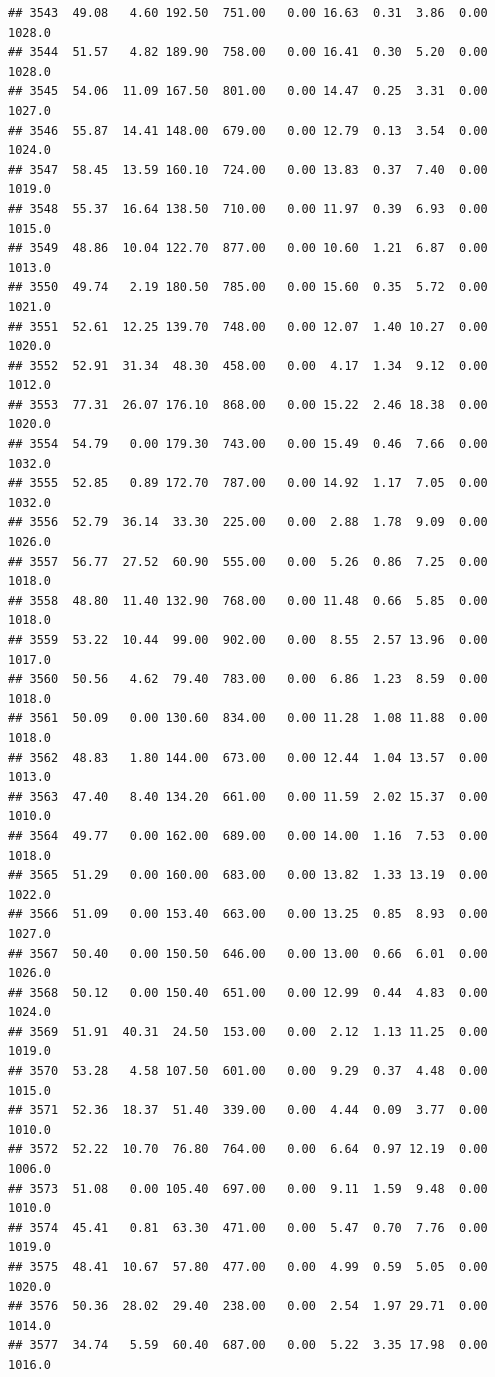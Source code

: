 \documentclass{article}\usepackage{graphicx, color}
\makeatletter
\newenvironment{kframe}{%
 \def\at@end@of@kframe{}%
 \ifinner\ifhmode%
  \def\at@end@of@kframe{\end{minipage}}%
  \begin{minipage}{\columnwidth}%
 \fi\fi%
 \def\FrameCommand##1{\hskip\@totalleftmargin \hskip-\fboxsep
 \colorbox{shadecolor}{##1}\hskip-\fboxsep
     \hskip-\linewidth \hskip-\@totalleftmargin \hskip\columnwidth}%
 \MakeFramed {\advance\hsize-\width
   \@totalleftmargin\z@ \linewidth\hsize
   \@setminipage}}%
 {\par\unskip\endMakeFramed%
 \at@end@of@kframe}
\newenvironment{knitrout}{}{} %
\makeatother
\begin{document}
\begin{knitrout}
\begin{kframe}
\begin{verbatim}
## 3543  49.08   4.60 192.50  751.00   0.00 16.63  0.31  3.86  0.00 1028.0
## 3544  51.57   4.82 189.90  758.00   0.00 16.41  0.30  5.20  0.00 1028.0
## 3545  54.06  11.09 167.50  801.00   0.00 14.47  0.25  3.31  0.00 1027.0
## 3546  55.87  14.41 148.00  679.00   0.00 12.79  0.13  3.54  0.00 1024.0
## 3547  58.45  13.59 160.10  724.00   0.00 13.83  0.37  7.40  0.00 1019.0
## 3548  55.37  16.64 138.50  710.00   0.00 11.97  0.39  6.93  0.00 1015.0
## 3549  48.86  10.04 122.70  877.00   0.00 10.60  1.21  6.87  0.00 1013.0
## 3550  49.74   2.19 180.50  785.00   0.00 15.60  0.35  5.72  0.00 1021.0
## 3551  52.61  12.25 139.70  748.00   0.00 12.07  1.40 10.27  0.00 1020.0
## 3552  52.91  31.34  48.30  458.00   0.00  4.17  1.34  9.12  0.00 1012.0
## 3553  77.31  26.07 176.10  868.00   0.00 15.22  2.46 18.38  0.00 1020.0
## 3554  54.79   0.00 179.30  743.00   0.00 15.49  0.46  7.66  0.00 1032.0
## 3555  52.85   0.89 172.70  787.00   0.00 14.92  1.17  7.05  0.00 1032.0
## 3556  52.79  36.14  33.30  225.00   0.00  2.88  1.78  9.09  0.00 1026.0
## 3557  56.77  27.52  60.90  555.00   0.00  5.26  0.86  7.25  0.00 1018.0
## 3558  48.80  11.40 132.90  768.00   0.00 11.48  0.66  5.85  0.00 1018.0
## 3559  53.22  10.44  99.00  902.00   0.00  8.55  2.57 13.96  0.00 1017.0
## 3560  50.56   4.62  79.40  783.00   0.00  6.86  1.23  8.59  0.00 1018.0
## 3561  50.09   0.00 130.60  834.00   0.00 11.28  1.08 11.88  0.00 1018.0
## 3562  48.83   1.80 144.00  673.00   0.00 12.44  1.04 13.57  0.00 1013.0
## 3563  47.40   8.40 134.20  661.00   0.00 11.59  2.02 15.37  0.00 1010.0
## 3564  49.77   0.00 162.00  689.00   0.00 14.00  1.16  7.53  0.00 1018.0
## 3565  51.29   0.00 160.00  683.00   0.00 13.82  1.33 13.19  0.00 1022.0
## 3566  51.09   0.00 153.40  663.00   0.00 13.25  0.85  8.93  0.00 1027.0
## 3567  50.40   0.00 150.50  646.00   0.00 13.00  0.66  6.01  0.00 1026.0
## 3568  50.12   0.00 150.40  651.00   0.00 12.99  0.44  4.83  0.00 1024.0
## 3569  51.91  40.31  24.50  153.00   0.00  2.12  1.13 11.25  0.00 1019.0
## 3570  53.28   4.58 107.50  601.00   0.00  9.29  0.37  4.48  0.00 1015.0
## 3571  52.36  18.37  51.40  339.00   0.00  4.44  0.09  3.77  0.00 1010.0
## 3572  52.22  10.70  76.80  764.00   0.00  6.64  0.97 12.19  0.00 1006.0
## 3573  51.08   0.00 105.40  697.00   0.00  9.11  1.59  9.48  0.00 1010.0
## 3574  45.41   0.81  63.30  471.00   0.00  5.47  0.70  7.76  0.00 1019.0
## 3575  48.41  10.67  57.80  477.00   0.00  4.99  0.59  5.05  0.00 1020.0
## 3576  50.36  28.02  29.40  238.00   0.00  2.54  1.97 29.71  0.00 1014.0
## 3577  34.74   5.59  60.40  687.00   0.00  5.22  3.35 17.98  0.00 1016.0

\end{verbatim}
\end{kframe}
\end{knitrout}
\end{document}
